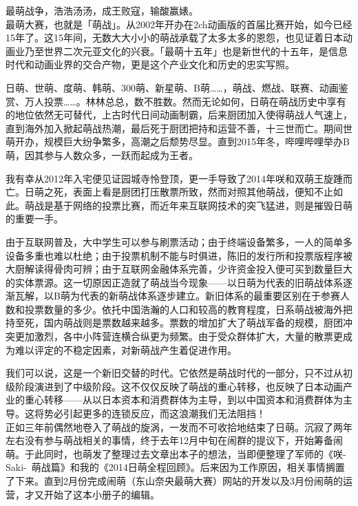 
最萌战争，浩浩汤汤，成王败寇，输酸赢婊。
\\

最萌大赛，也就是「萌战」。从2002年开办在2ch动画版的首届比赛开始，如今已经15年了。这15年间，无数大大小小的萌战承载了太多太多的恩怨，也见证着日本动画业乃至世界二次元亚文化的兴衰。「最萌十五年」也是新世代的十五年，是信息时代和动画业界的交合产物，更是这个产业文化和历史的忠实写照。

日萌、世萌、度萌、韩萌、300萌、新星萌、B萌……，萌战、燃战、联赛、动画鉴赏、万人投票……。林林总总，数不胜数。然而无论如何，日萌在萌战历史中享有的地位依然无可替代，上古时代日间动画制霸，后来厨团加入使得萌战人气速上，直到海外加入掀起萌战热潮，最后死于厨团把持和运营不善，十三世而亡。期间世萌开办，规模巨大纷争繁多，高潮之后颓势尽显。直到2015年冬，哔哩哔哩举办B萌，因其参与人数众多，一跃而起成为王者。

我有幸从2012年入宅便见证园城寺怜登顶，更一手导致了2014年咲和双萌王旋踵而亡。日萌之死，表面上看是厨团打压散票所致，然而对照其他萌战，便知不止如此。萌战是基于网络的投票比赛，而近年来互联网技术的突飞猛进，则是摧毁日萌的重要一手。

由于互联网普及，大中学生可以参与刷票活动；由于终端设备繁多，一人的简单多设备多重也难以杜绝；由于投票机制不能与时俱进，陈旧的发行所和投票版程序被大厨解读得骨肉可辨；由于互联网金融体系完善，少许资金投入便可买到数量巨大的实体票源。这一切原因正造就了萌战当今现象——以日萌为代表的旧萌战体系逐渐瓦解，以B萌为代表的新萌战体系逐步建立。新旧体系的最重要区别在于参赛人数和投票数量的多少。依托中国浩瀚的人口和较高的教育程度，日系萌战被海外把持至死，国内萌战则是票数越来越多。票数的增加扩大了萌战军备的规模，厨团冲突更加激烈，各中小阵营连横合纵更为频繁。由于受众群体扩大，大量的散票更成为难以评定的不稳定因素，对新萌战产生着促进作用。

我们可以说，这是一个新旧交替的时代。它依然是萌战时代的一部分，只不过从初级阶段演进到了中级阶段。这不仅仅反映了萌战的重心转移，也反映了日本动画产业的重心转移——从以日本资本和消费群体为主导，到以中国资本和消费群体为主导。这将势必引起更多的连锁反应，而这浪潮我们无法阻挡！
\\

正如三年前偶然地卷入了萌战的旋涡，一发而不可收拾地结束了日萌。沉寂了两年左右没有参与萌战相关的事情，终于去年12月中旬在闹群的提议下，开始筹备闹萌。于此同时，也萌发了整理过去文章出本子的想法，当即便整理了军师的《咲-Saki-~萌战篇》和我的《2014日萌全程回顾》。后来因为工作原因，相关事情搁置了下来。直到2月份完成闹萌（东山奈央最萌大赛）网站的开发以及3月份闹萌的运营，才又开始了这本小册子的编辑。

